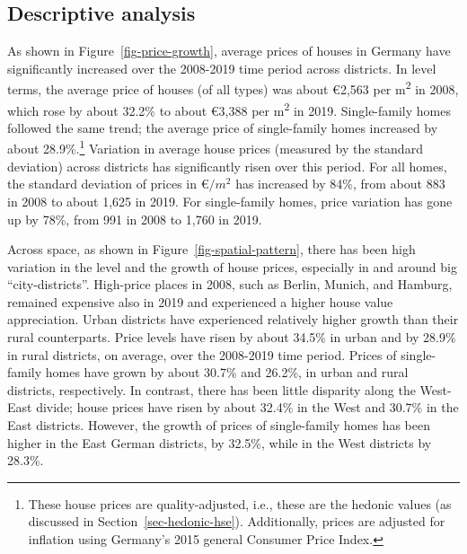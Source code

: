 \documentclass[
  12pt,
]{article}
\begin{document}
\subsection{Descriptive analysis}\label{descriptive-analysis}

As shown in Figure~\ref{fig-price-growth}, average prices of houses in
Germany have significantly increased over the 2008-2019 time period
across districts. In level terms, the average price of houses (of all
types) was about €2,563 per m\textsuperscript{2} in 2008, which rose by
about 32.2\% to about €3,388 per m\textsuperscript{2} in 2019.
Single-family homes followed the same trend; the average price of
single-family homes increased by about 28.9\%.\footnote{These house
  prices are quality-adjusted, i.e., these are the hedonic values (as
  discussed in Section~\ref{sec-hedonic-hse}). Additionally, prices are
  adjusted for inflation using Germany's 2015 general Consumer Price
  Index.} Variation in average house prices (measured by the standard
deviation) across districts has significantly risen over this period.
For all homes, the standard deviation of prices in €\(/m^2\) has
increased by 84\%, from about 883 in 2008 to about 1,625 in 2019. For
single-family homes, price variation has gone up by 78\%, from 991 in
2008 to 1,760 in 2019.

Across space, as shown in Figure~\ref{fig-spatial-pattern}, there has
been high variation in the level and the growth of house prices,
especially in and around big ``city-districts''. High-price places in
2008, such as Berlin, Munich, and Hamburg, remained expensive also in
2019 and experienced a higher house value appreciation. Urban districts
have experienced relatively higher growth than their rural counterparts.
Price levels have risen by about 34.5\% in urban and by 28.9\% in rural
districts, on average, over the 2008-2019 time period. Prices of
single-family homes have grown by about 30.7\% and 26.2\%, in urban and
rural districts, respectively. In contrast, there has been little
disparity along the West-East divide; house prices have risen by about
32.4\% in the West and 30.7\% in the East districts. However, the growth
of prices of single-family homes has been higher in the East German
districts, by 32.5\%, while in the West districts by 28.3\%.
\end{document}
